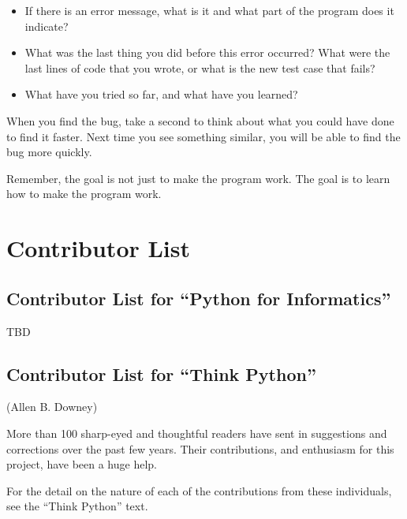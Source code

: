 \documentclass[10pt]{book}
\begin{document}
\begin{itemize}

\item If there is an error message, what is it
and what part of the program does it indicate?

\item What was the last thing you did before this error occurred?
What were the last lines of code that you wrote, or what is
the new test case that fails?

\item What have you tried so far, and what have you learned?

\end{itemize}

When you find the bug, take a second to think about what you
could have done to find it faster.  Next time you see something
similar, you will be able to find the bug more quickly.

Remember, the goal is not just to make the program
work.  The goal is to learn how to make the program work.



\chapter{Contributor List}
\section*{Contributor List for ``Python for Informatics''}

TBD

\section*{Contributor List for ``Think Python''}


(Allen B. Downey)

More than 100 sharp-eyed and thoughtful readers have sent in
suggestions and corrections over the past few years.  Their
contributions, and enthusiasm for this project, have been a
huge help.

For the detail on the nature of each of the contributions from
these individuals, see the ``Think Python'' text.
\end{document}
